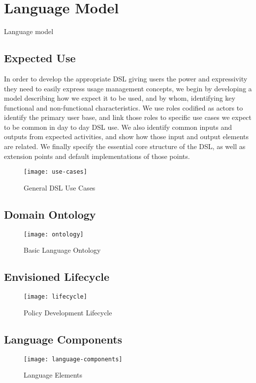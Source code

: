 \section{Language Model}\label{sec:model}
Language model

\subsection{Expected Use}
In order to develop the appropriate DSL giving users the power and expressivity they need to easily express usage management concepts, we begin by developing a model describing how we expect it to be used, and by whom, identifying key functional and non-functional characteristics.  We use roles codified as actors to identify the primary user base, and link those roles to specific use cases we expect to be common in day to day DSL use.  We also identify common inputs and outputs from expected activities, and show how those input and output elements are related.  We finally specify the essential core structure of the DSL, as well as extension points and default implementations of those points.

\begin{figure}[!t]
\centering
\texttt{[image: use-cases]}
\caption{General DSL Use Cases}
\label{fig:model:use-cases}
\end{figure}

\subsection{Domain Ontology}

\begin{figure}[!t]
\centering
\texttt{[image: ontology]}
\caption{Basic Language Ontology}
\label{fig:model:ontology}
\end{figure}

\subsection{Envisioned Lifecycle}

\begin{figure}[!t]
\centering
\texttt{[image: lifecycle]}
\caption{Policy Development Lifecycle}
\label{fig:model:lifecycle}
\end{figure}

\subsection{Language Components}

\begin{figure}[!t]
\centering
\texttt{[image: language-components]}
\caption{Language Elements}
\label{fig:model:language-components}
\end{figure}
